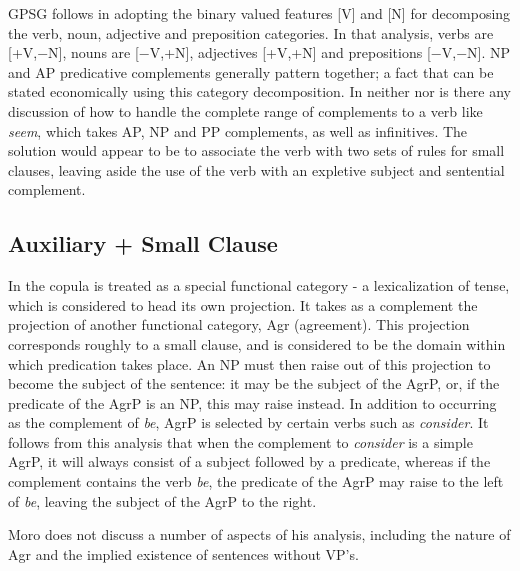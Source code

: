 GPSG follows \cite{chomsky70} in adopting the binary valued features [V] and 
[N] for decomposing the verb, noun, adjective and preposition categories.  In 
that analysis, verbs are [+V,$-$N], nouns are [$-$V,+N], adjectives [+V,+N] and 
prepositions [$-$V,$-$N].  NP and AP predicative complements generally pattern 
together; a fact that can be stated economically using this category 
decomposition.  In neither \cite{sag85} nor \cite{chomsky70} is there any 
discussion of how to handle the complete range of complements to a verb like 
{\it seem}, which takes AP, NP and PP complements, as well as infinitives.  The 
solution would appear to be to associate the verb with two sets of rules for 
small clauses, leaving aside the use of the verb with an expletive subject and 
sentential complement. 
 
\subsection{Auxiliary + Small Clause} 
 
\label{mo} 
In \cite{moro90} the copula is treated as a special functional category - a 
lexicalization of tense, which is considered to head its own projection. It 
takes as a complement the projection of another functional category, Agr 
(agreement). This projection corresponds roughly to a small clause, and is 
considered to be the domain within which predication takes place.  An NP must 
then raise out of this projection to become the subject of the sentence: it may 
be the subject of the AgrP, or, if the predicate of the AgrP is an NP, this may 
raise instead.  In addition to occurring as the complement of {\it be}, AgrP is 
selected by certain verbs such as {\it consider}. It follows from this analysis 
that when the complement to {\it consider} is a simple AgrP, it will always 
consist of a subject followed by a predicate, whereas if the complement 
contains the verb {\it be}, the predicate of the AgrP may raise to the left of 
{\it be}, leaving the subject of the AgrP to the right. 
 
\beginsentences
{}\label{ex:598} 
\label{ex:599} 
\label{ex:600} 
\label{ex:601} 
\label{ex:602} 
\endsentences

 
Moro does not discuss a number of aspects of his analysis, including the 
nature of Agr and the implied existence of sentences without VP's. 
 
